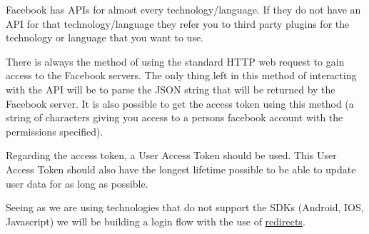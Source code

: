 \documentclass{article}
\begin{document}
			Facebook has APIs for almost every technology/language. If they do not have an API for that technology/language they refer you to third party plugins for the technology or language that you want to use.

			There is always the method of using the standard HTTP web request to gain access to the Facebook servers. The only thing left in this method of interacting with the API will be to parse the JSON string that will be returned by the Facebook server. It is also possible to get the access token using this method (a string of characters giving you access to a persons facebook account with the permissions specified).

			Regarding the access token, a User Access Token should be used. This User Access Token should also have the longest lifetime possible to be able to update user data for as long as possible.

			Seeing as we are using technologies that do not support the SDKs (Android, IOS, Javascript) we will be building a login flow with the use of \href{https://developers.facebook.com/docs/facebook-login/manually-build-a-login-flow}{redirects}.\\
\end{document}
